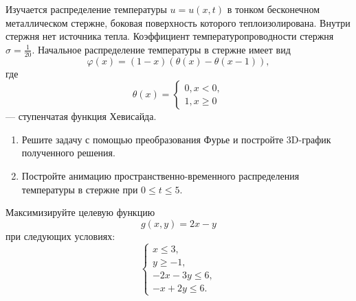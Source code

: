  Изучается распределение температуры $u=u(x, t)$ в тонком бесконечном металлическом стержне, боковая поверхность которого теплоизолирована. Внутри стержня нет источника тепла. Коэффициент температуропроводности стержня $\sigma = \frac{1}{20}$. Начальное распределение температуры в стержне имеет вид
\[ \varphi (x)=(1-x)(\theta (x)- \theta (x-1)), \]
где 
\[
\theta (x) =
\begin{cases}
0, x < 0,\\
1, x \ge 0
\end{cases}
\]
--- ступенчатая функция Хевисайда.\\
 \begin{enumerate}
 \item Решите задачу с помощью преобразования Фурье и постройте 3D-график полученного решения.
\item Постройте анимацию пространственно-временного распределения температуры в стержне при $0 \le t \le 5$.

\end{enumerate}
 Максимизируйте целевую функцию
\[ g(x, y)=2x-y \]
при следующих условиях:
\[
\begin{cases}
x \le 3,\\
y \ge -1,\\
-2x-3y \le 6,\\
-x+2y \le 6.
\end{cases}
\]
































